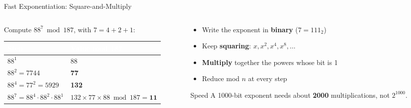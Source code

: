 \documentclass[aspectratio=169,11pt,xcolor={table}]{beamer}
\begin{document}
\begin{frame}{Fast Exponentiation: Square-and-Multiply}
  \begin{columns}[c]
    \begin{column}{0.55\textwidth}
      \centering
      {\small Compute $88^{7} \bmod 187$, with $7 = 4 + 2 + 1$:}\\[2mm]
      \renewcommand{\arraystretch}{1.35}
      \small
      \begin{tabular}{l l}
        \toprule
        \rowcolor{navy}\textcolor{white}{\textbf{Step}} & \textcolor{white}{\textbf{Value mod 187}}\\
        \midrule
        $88^{1}$ & 88\\
        $88^{2} = 7744$ & \textbf{77}\\
        $88^{4} = 77^2 = 5929$ & \textbf{132}\\
        \rowcolor{amber!15} $88^{7} = 88^{4}\cdot 88^{2}\cdot 88^{1}$ & $132 \times 77 \times 88 \bmod 187 = \mathbf{11}$\\
        \bottomrule
      \end{tabular}
    \end{column}
    \begin{column}{0.43\textwidth}
      \begin{itemize}\small\setlength{\itemsep}{4pt}
        \item Write the exponent in \textbf{binary} ($7 = 111_2$)
        \item Keep \textbf{squaring}: $x, x^2, x^4, x^8, \dots$
        \item \textbf{Multiply} together the powers whose bit is 1
        \item Reduce mod $n$ at every step
      \end{itemize}
      \begin{exampleblock}{Speed}
        \small A 1000-bit exponent needs about \textbf{2000} multiplications, not $2^{1000}$.
      \end{exampleblock}
    \end{column}
  \end{columns}
\end{frame}
\end{document}
